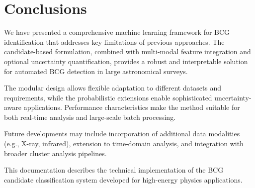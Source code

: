 \documentclass[twocolumn,10pt]{aastex631}
\begin{document}
\section{Conclusions}

We have presented a comprehensive machine learning framework for BCG identification that addresses key limitations of previous approaches. The candidate-based formulation, combined with multi-modal feature integration and optional uncertainty quantification, provides a robust and interpretable solution for automated BCG detection in large astronomical surveys.

The modular design allows flexible adaptation to different datasets and requirements, while the probabilistic extensions enable sophisticated uncertainty-aware applications. Performance characteristics make the method suitable for both real-time analysis and large-scale batch processing.

Future developments may include incorporation of additional data modalities (e.g., X-ray, infrared), extension to time-domain analysis, and integration with broader cluster analysis pipelines.

\acknowledgments
This documentation describes the technical implementation of the BCG candidate classification system developed for high-energy physics applications.

\end{document}
